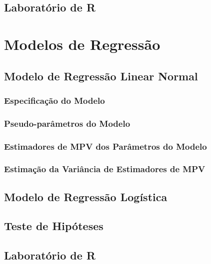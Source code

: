 \documentclass[]{book}
\theoremstyle{definition}
\theoremstyle{definition}
\theoremstyle{definition}
\theoremstyle{remark}
\begin{document}
\section{Laboratório de R}\label{laboratorio-de-r-2}

\chapter{Modelos de Regressão}\label{modreg}

\section{Modelo de Regressão Linear Normal}\label{modlinear}

\subsection{Especificação do Modelo}\label{especificacao-do-modelo}

\subsection{Pseudo-parâmetros do
Modelo}\label{pseudo-parametros-do-modelo}

\subsection{Estimadores de MPV dos Parâmetros do
Modelo}\label{estimadores-de-mpv-dos-parametros-do-modelo}

\subsection{Estimação da Variância de Estimadores de
MPV}\label{estimacao-da-variancia-de-estimadores-de-mpv}

\section{Modelo de Regressão Logística}\label{modlogist}

\section{Teste de Hipóteses}\label{teste-de-hipoteses}

\section{Laboratório de R}\label{laboratorio-de-r-3}
\end{document}
